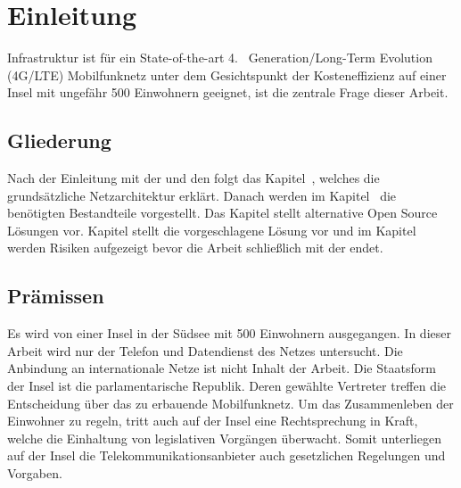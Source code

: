 
%
%
% 
% 
% 

\section{Einleitung}
\label{sec:einleitung}
 Infrastruktur ist für ein State-of-the-art  4.~ Generation/Long-Term Evolution (4G/LTE)  Mobilfunknetz unter dem Gesichtspunkt der Kosteneffizienz auf einer Insel mit ungefähr 500 Einwohnern geeignet, ist die zentrale Frage dieser Arbeit.
\subsection{Gliederung}
\label{subsec:gliederung}
Nach der Einleitung mit der  und den  folgt das Kapitel~, welches die grundsätzliche Netzarchitektur erklärt. Danach werden im Kapitel~ die benötigten Bestandteile vorgestellt. Das Kapitel  stellt alternative Open Source Lösungen vor. Kapitel  stellt die vorgeschlagene Lösung vor und im Kapitel  werden Risiken aufgezeigt bevor die Arbeit schließlich mit der  endet.
\subsection{Prämissen}
\label{subsec:praemissen}
Es wird von einer Insel in der Südsee mit 500 Einwohnern ausgegangen. In dieser Arbeit wird nur der Telefon und Datendienst des Netzes untersucht. Die Anbindung an internationale Netze ist nicht Inhalt der Arbeit. Die Staatsform der Insel ist die parlamentarische Republik. Deren gewählte Vertreter treffen die Entscheidung über das zu erbauende Mobilfunknetz. Um das Zusammenleben der Einwohner zu regeln, tritt auch auf der Insel eine Rechtsprechung in Kraft, welche die Einhaltung von legislativen Vorgängen überwacht. Somit unterliegen auf der Insel die Telekommunikationsanbieter auch gesetzlichen Regelungen und Vorgaben.

